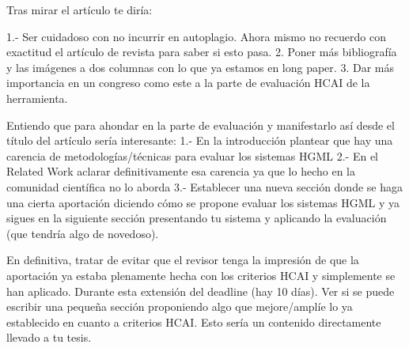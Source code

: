 Tras mirar el artículo te diría:

1.- Ser cuidadoso con no incurrir en autoplagio. Ahora mismo no recuerdo con exactitud el artículo de revista para saber si esto pasa.
2. Poner más bibliografía y las imágenes a dos columnas con lo que ya estamos en long paper.
3. Dar más importancia en un congreso como este a la parte de evaluación HCAI de la herramienta.


 Entiendo que para ahondar en la parte de evaluación y manifestarlo así desde el título del artículo sería interesante:
1.- En la introducción plantear que hay una carencia de metodologías/técnicas para evaluar los sistemas HGML
 2.- En el Related Work aclarar definitivamente esa carencia ya que lo hecho en la comunidad científica no lo aborda
3.- Establecer una nueva sección donde se haga una cierta aportación diciendo cómo se propone evaluar los sistemas HGML y ya sigues en la siguiente sección presentando tu sistema y aplicando la evaluación (que tendría algo de novedoso).
 
En definitiva, tratar de evitar que el revisor tenga la impresión de que la aportación ya estaba plenamente hecha con los criterios HCAI y simplemente se han aplicado. Durante esta extensión del deadline (hay 10 días). Ver si se puede escribir una pequeña sección proponiendo algo que mejore/amplíe lo ya establecido en cuanto a criterios HCAI. Esto sería un contenido directamente llevado a tu tesis.